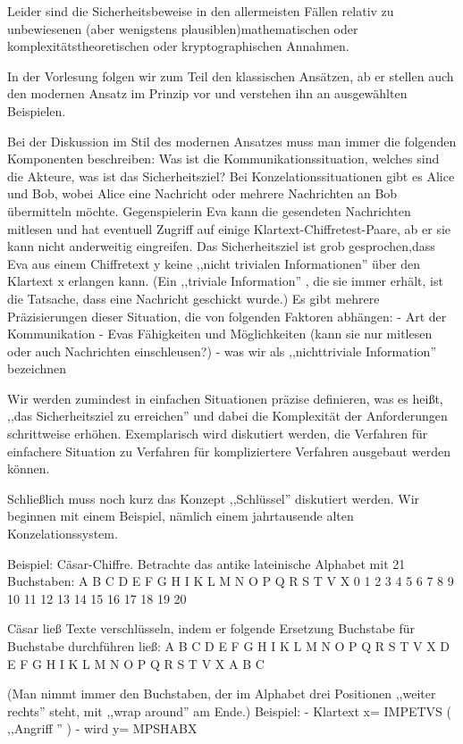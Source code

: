 \documentclass[a4paper]{article}
\begin{document}
\begin{multicols}{3}
    Leider sind die Sicherheitsbeweise in den allermeisten Fällen relativ zu unbewiesenen (aber wenigstens plausiblen)mathematischen oder komplexitätstheoretischen oder kryptographischen Annahmen.

    In der Vorlesung folgen wir zum Teil den klassischen Ansätzen, ab er stellen auch den modernen Ansatz im Prinzip vor und verstehen ihn an ausgewählten Beispielen.

    Bei der Diskussion im Stil des modernen Ansatzes muss man immer die folgenden Komponenten beschreiben: Was ist die Kommunikationssituation, welches sind die Akteure, was ist das Sicherheitsziel? Bei Konzelationssituationen gibt es Alice und Bob, wobei Alice eine Nachricht oder mehrere Nachrichten an Bob übermitteln möchte. Gegenspielerin Eva kann die gesendeten Nachrichten mitlesen und hat eventuell Zugriff auf einige Klartext-Chiffretest-Paare, ab er sie kann nicht anderweitig eingreifen. Das Sicherheitsziel ist grob gesprochen,dass Eva aus einem Chiffretext y keine ,,nicht trivialen Informationen''  über den Klartext x erlangen kann. (Ein ,,triviale Information'' , die sie immer erhält, ist die Tatsache, dass eine Nachricht geschickt wurde.) Es gibt mehrere Präzisierungen dieser Situation, die von folgenden Faktoren abhängen:
    - Art der Kommunikation
    - Evas Fähigkeiten und Möglichkeiten (kann sie nur mitlesen oder auch Nachrichten einschleusen?)
    - was wir als ,,nichttriviale Information'' bezeichnen

    Wir werden zumindest in einfachen Situationen präzise definieren, was es heißt, ,,das Sicherheitsziel zu erreichen'' und dabei die Komplexität der Anforderungen schrittweise erhöhen.
    Exemplarisch wird diskutiert werden, die Verfahren für einfachere Situation zu Verfahren für kompliziertere Verfahren ausgebaut werden können.

    Schließlich muss noch kurz das Konzept ,,Schlüssel''  diskutiert werden. Wir beginnen mit einem Beispiel, nämlich einem jahrtausende alten Konzelationssystem.

    Beispiel: Cäsar-Chiffre. Betrachte das antike lateinische Alphabet mit 21 Buchstaben:
    A B C D E F G H I K L M N O P Q R S T V X
    0 1 2 3 4 5 6 7 8 9 10 11 12 13 14 15 16 17 18 19 20

    Cäsar ließ Texte verschlüsseln, indem er folgende Ersetzung Buchstabe für Buchstabe durchführen ließ:
    A B C D E F G H I K L M N O P Q R S T V X
    D E F G H I K L M N O P Q R S T V X A B C

    (Man nimmt immer den Buchstaben, der im Alphabet drei Positionen ,,weiter rechts'' steht, mit ,,wrap around'' am Ende.)
    Beispiel:
    - Klartext x= IMPETVS ( ,,Angriff '' )
    - wird y= MPSHABX


\end{multicols}
\end{document}
